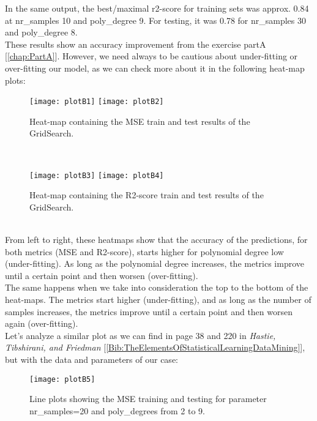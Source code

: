 In the same output, the best/maximal r2-score for training sets was approx. 0.84 at nr\_samples 10 and poly\_degree 9. For testing, it was 0.78 for nr\_samples 30 and poly\_degree 8.\\

These results show an accuracy improvement from the exercise partA [\autoref{chap:PartA}]. However, we need always to be cautious about under-fitting or over-fitting our model, as we can check more about it in the following heat-map plots:\\

\begin{figure}[h]
\label{fig:plotB1and2}
\texttt{[image: plotB1]}
\texttt{[image: plotB2]}
\caption{Heat-map containing the MSE train and test results of the GridSearch.}
\centering
\end{figure}\\

\begin{figure}[h]
\label{fig:plotB3and4}
\texttt{[image: plotB3]}
\texttt{[image: plotB4]}
\caption{Heat-map containing the R2-score train and test results of the GridSearch.}
\centering
\end{figure}\\

From left to right, these heatmaps show that the accuracy of the predictions, for both metrics (MSE and R2-score), starts higher for polynomial degree low (under-fitting). As long as the polynomial degree increases, the metrics improve until a certain point and then worsen (over-fitting).\\

The same happens when we take into consideration the top to the bottom of the heat-maps. The metrics start higher (under-fitting), and as long as the number of samples increases, the metrics improve until a certain point and then worsen again (over-fitting).\\

Let's analyze a similar plot as we can find in page 38 and 220 in \textit{Hastie, Tibshirani, and Friedman} [\ref{Bib:TheElementsOfStatisticalLearningDataMining}], but with the data and parameters of our case:\\

\begin{figure}[h]
\label{fig:plotB5}
\texttt{[image: plotB5]}
\caption{Line plots showing the MSE training and testing for parameter nr\_samples=20 and poly\_degrees from 2 to 9.}
\centering
\end{figure}\\

